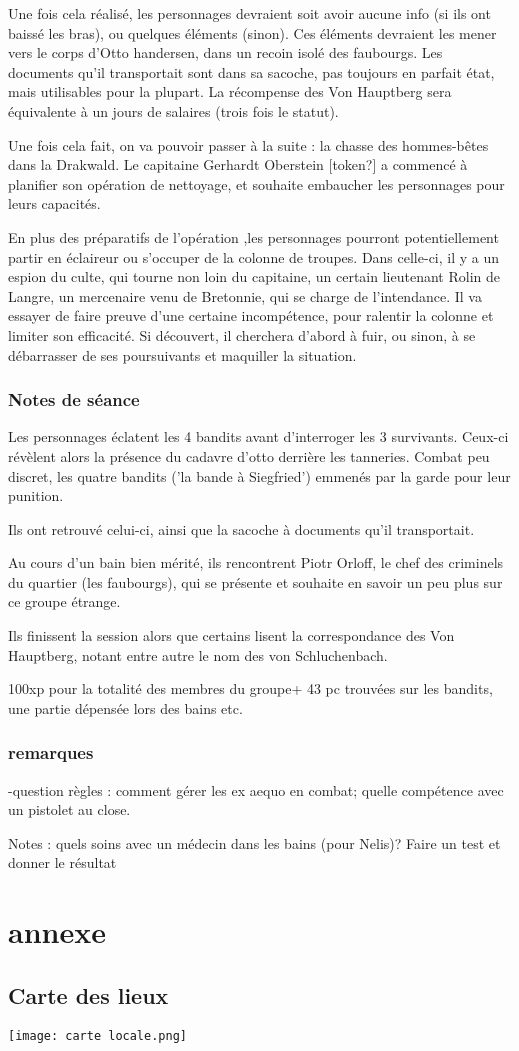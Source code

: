 \documentclass[10pt,a4paper]{book}
\begin{document}
Une fois cela réalisé, les personnages devraient soit avoir aucune info (si ils ont baissé les bras), ou quelques éléments (sinon). Ces éléments devraient les mener vers le corps d'Otto handersen, dans un recoin isolé des faubourgs. Les documents qu'il transportait sont dans sa sacoche, pas toujours en parfait état, mais utilisables pour la plupart. La récompense des Von Hauptberg sera équivalente à un jours de salaires (trois fois le statut).

Une fois cela fait, on va pouvoir passer à la suite : la chasse des hommes-bêtes dans la Drakwald. Le capitaine Gerhardt Oberstein [token?] a commencé à planifier son opération de nettoyage, et souhaite embaucher les personnages pour leurs capacités.

En plus des préparatifs de l'opération ,les personnages pourront potentiellement partir en éclaireur ou s'occuper de la colonne de troupes. Dans celle-ci, il y a un espion du culte, qui tourne non loin du capitaine, un certain lieutenant Rolin de Langre, un mercenaire venu de Bretonnie, qui se charge de l'intendance. Il va essayer de faire preuve d'une certaine incompétence, pour ralentir la colonne et limiter son efficacité. Si découvert, il cherchera d'abord à fuir, ou sinon, à se débarrasser de ses poursuivants et maquiller la situation.
\subsection{Notes de séance}
Les personnages éclatent les 4 bandits avant d'interroger les 3 survivants. Ceux-ci révèlent alors la présence du cadavre d'otto derrière les tanneries.  Combat peu discret, les quatre bandits ('la bande à Siegfried') emmenés par la garde pour leur punition.

Ils ont retrouvé celui-ci, ainsi que la sacoche à documents qu'il transportait. 

Au cours d'un bain bien mérité, ils rencontrent Piotr Orloff, le chef des criminels du quartier (les faubourgs), qui se présente et souhaite en savoir un peu plus sur ce groupe étrange.

Ils finissent la session alors que certains lisent la correspondance des Von Hauptberg, notant entre autre le nom des von Schluchenbach.

100xp pour la totalité des membres du groupe+ 43 pc trouvées sur les bandits, une partie dépensée lors des bains etc.
\subsection{remarques}
-question règles : comment gérer les ex aequo en combat; quelle compétence avec un pistolet au close.

Notes : quels soins avec un médecin dans les bains (pour Nelis)? Faire un test et donner le résultat
\chapter*{annexe}
\section{Carte des lieux}
\texttt{[image: carte locale.png]}
\end{document}
